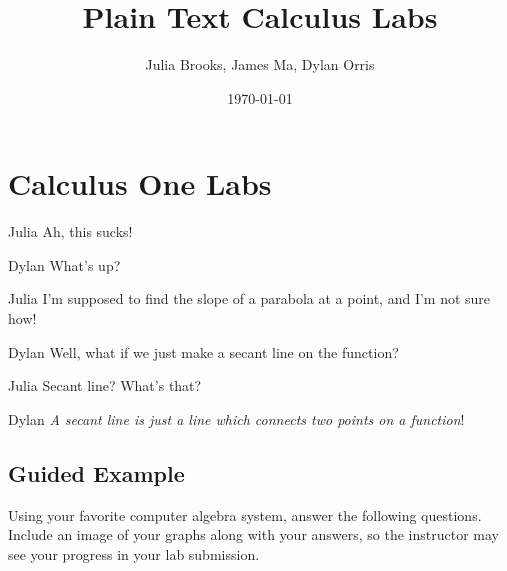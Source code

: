 \documentclass{ximera}
\theoremstyle{definition}
\begin{document}
\title{Plain Text Calculus Labs}
\author{Julia Brooks, James Ma, Dylan Orris}
\date{\today}

\section{Calculus One Labs}

\begin{dialogue}
\item[Julia] Ah, this sucks!
\item[Dylan] What's up?
\item[Julia] I'm supposed to find the slope of a parabola at a point, and I'm not sure how!
\item[Dylan] Well, what if we just make a secant line on the function?
\item[Julia] Secant line? What's that?
\item[Dylan] \textit{A secant line is just a line which connects two points on a function}!
\end{dialogue}

\subsection{Guided Example}
Using your favorite computer algebra system, answer the following questions. Include an image of your graphs along with your answers, so the instructor may see your progress in your lab submission.
\end{document}
